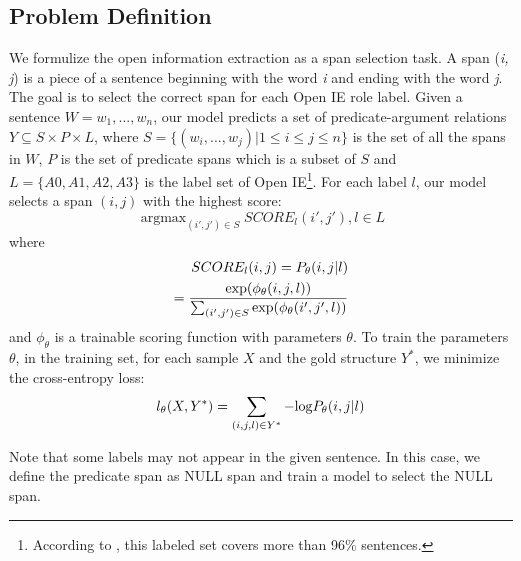 \documentclass[letterpaper]{article} \usepackage{aaai20}  \usepackage{times}  \usepackage{helvet} \usepackage{courier}  \usepackage[hyphens]{url}  \urlstyle{rm} \def\UrlFont{\rm}  \usepackage{graphicx}  \frenchspacing  \setlength{\pdfpagewidth}{8.5in}  \setlength{\pdfpageheight}{11in}
\begin{document}
\subsection{Problem Definition}
We formulize the open information extraction as a span selection task. A span (\textit{i, j}) is a piece of a sentence beginning with the word \textit{i} and ending with the word \textit{j}. The goal is to select the correct span for each Open IE role label. Given a sentence $W=w_1,...,w_n$, our model predicts a set of predicate-argument relations $Y \subseteq  S \times P \times L$, where $S=\{(w_i,...,w_j)|1\leq i \leq j \leq n\}$ is the set of all the spans in $W$, $P$ is the set of predicate spans which is a subset of $S$ and $L=\{A0, A1, A2, A3\}$ is the label set of Open IE\footnote{According to \cite{Stanovsky2018SupervisedOI}, this labeled set covers more than 96\% sentences.}. For each label $l$, our model selects a span $(i,j)$ with the highest score:
\begin{equation}
    \mathop{\arg\max}_{(i',j')\in S} SCORE_l (i',j'), l \in L
\end{equation}
where
\begin{equation}
    \begin{split}
      SCORE_l (i,j)= P_{\theta}(i,j|l) \\ = \frac{{\rm exp}(\phi_\theta (i,j,l))}{\sum_{(i',j') \in S} {\rm exp}(\phi_\theta (i',j',l))}  
    \end{split}
\end{equation}
and $\phi_\theta$ is a trainable scoring function with parameters $\theta$. To train the parameters $\theta$, in the training set, for each sample $X$ and the gold structure $Y^*$, we minimize the cross-entropy loss:
\begin{equation}\label{loss}
    l_\theta(X,Y^*)=\sum_{(i,j,l)\in Y^*} -{\rm log} P_{\theta}(i,j|l)
\end{equation}

Note that some labels may not appear in the given sentence. In this case, we define the predicate span as NULL span and train a model to select the NULL span.
\end{document}
